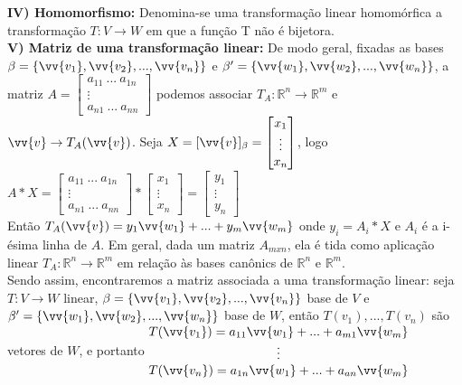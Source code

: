\documentclass[11pt,a4paper]{article}
\newcommand\tab[1][1.835cm]{\hspace*{#1}}
\begin{document}
\begin{flushleft}
\tab \textbf {IV) Homomorfismo:} Denomina-se uma transformação linear homomórfica a transformação  $T: V \rightarrow W$ em que a função T não é bijetora. \linebreak
\\
\tab \textbf{V) Matriz de uma transformação linear:} De modo geral, fixadas as bases $\beta = \{\vv{v_1}, \vv{v_2},...,\vv{v_n}\}$ e $\beta' = \{\vv{w_1},\vv{w_2},...,\vv{w_n}\}$, a matriz $A = \begin{bmatrix} a_{11} \ ... \ a_{1n} \\ \vdots \\ a_{n1} \ ... \ a_{nn} \end{bmatrix} $ podemos associar $T_A: \mathbb{R}^n \rightarrow \mathbb{R}^m$ e $ \vv{v} \rightarrow T_A(\vv{v})$. \linebreak
\tab Seja $X =[\vv{v}]_\beta = \begin{bmatrix} x_1 \\ \vdots \\ x_n \end{bmatrix}$, logo $A*X = \begin{bmatrix} a_{11} \ ... \ a_{1n} \\ \vdots \\ a_{n1} \ ... \ a_{nn} \end{bmatrix} * \begin{bmatrix} x_1 \\ \vdots \\ x_n \end{bmatrix} = \begin{bmatrix} y_1 \\ \vdots \\ y_n \end{bmatrix}$ \linebreak
\\
\tab Então $T_A(\vv{v}) = y_1 \vv{w_1} + ... + y_m \vv{w_m}$ onde $y_i = A_i*X$ e $A_i$ é a i-ésima linha de $A$. Em geral, dada um matriz $A_{mxn}$, ela é tida como aplicação linear $T_A: \mathbb{R}^n \rightarrow \mathbb{R}^m$ em relação às bases canônics de $\mathbb{R}^n$ e $\mathbb{R}^m$.\linebreak
\\
\tab Sendo assim, encontraremos a matriz associada a uma transformação linear: seja $T: V \rightarrow W$ linear, $\beta = \{\vv{v_1}, \vv{v_2},...,\vv{v_n}\}$ base de $V$ e $\beta' = \{\vv{w_1},\vv{w_2},...,\vv{w_n}\}$ base de $W$, então $T(v_1),...,T(v_n)$ são vetores de $W$, e portanto \linebreak \newline \tab $\begin{matrix} T(\vv{v_1}) = a_{11}\vv{w_1} + ... + a_{m1}\vv{w_m} \\ \vdots \\ T(\vv{v_n}) = a_{1n}\vv{w_1} + ... + a_{an}\vv{w_m} \end{matrix}$ \linebreak

\end{flushleft}
\end{document}
